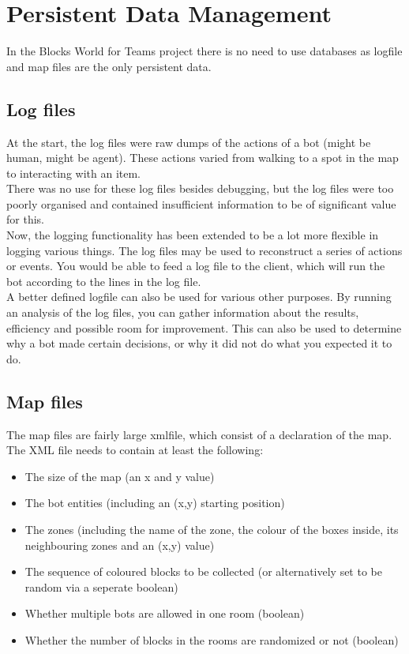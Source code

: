 \section{Persistent Data Management}
In the Blocks World for Teams project there is no need to use databases as \gls{logfile} and map files are the only persistent data.
\subsection{Log files}
At the start, the log files were raw dumps of the actions of a bot (might be human, might be agent). These actions varied from walking to a spot in the map to interacting with an item. \\
There was no use for these log files besides \gls{debugging}, but the log files were too poorly organised and contained insufficient information to be of significant value for this. \\
Now, the logging functionality has been extended to be a lot more flexible in logging various things. The log files may be used to reconstruct a series of actions or events. You would be able to feed a log file to the client, which will run the bot according to the lines in the log file. \\
A better defined logfile can also be used for various other purposes. By running an analysis of the log files, you can gather information about the results, efficiency and possible room for improvement. This can also be used to determine why a bot made certain decisions, or why it did not do what you expected it to do. 

\subsection{Map files}
The map files are fairly large \gls{xmlfile}, which consist of a declaration of the map. \\
The XML file needs to contain at least the following:
\begin{itemize}
\item The size of the map (an x and y value)
\item The bot entities (including an (x,y) starting position)
\item The zones (including the name of the zone, the colour of the boxes inside, its neighbouring zones and an (x,y) value)
\item The sequence of coloured blocks to be collected (or alternatively set to be random via a seperate boolean)
\item Whether multiple bots are allowed in one room (boolean)
\item Whether the number of blocks in the rooms are randomized or not (boolean)
\end{itemize}

